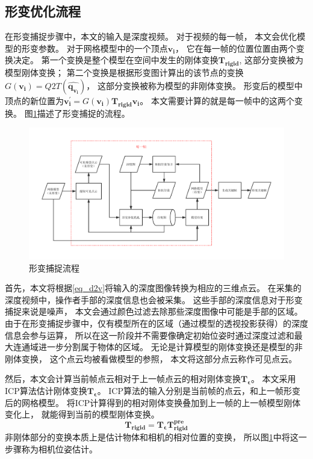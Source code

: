 \subsection{形变优化流程}
在形变捕捉步骤中，本文的输入是深度视频。
对于视频的每一帧，
本文会优化模型的形变参数。
对于网格模型中的一个顶点$\bm{v_i}$，
它在每一帧的位置位置由两个变换决定。
第一个变换是整个模型在空间中发生的刚体变换$\bm{T_{rigid}}$,
这部分变换被为模型刚体变换；
第二个变换是根据形变图计算出的该节点的变换$G(\bm{v_i})=Q2T(\hat{\bm{q_{v_i}}})$，
这部分变换被称为模型的非刚体变换。
形变后的模型中顶点的新位置为$\bm{v_i^{'}}=G(\bm{v_i})\bm{T_{rigid}}\bm{v_i}$。
本文需要计算的就是每一帧中的这两个变换。
图\ref{deformation_sampling}描述了形变捕捉的流程。
\begin{figure}
    \centering
    \includegraphics[width = \textwidth]{./Pictures/ds_pipeline_cropped.pdf}
    \caption{形变捕捉流程}
    \label{deformation_sampling}
\end{figure}
首先，本文将根据\ref{eq_d2v}将输入的深度图像转换为相应的三维点云。
在采集的深度视频中，操作者手部的深度信息也会被采集。
这些手部的深度信息对于形变捕捉来说是噪声，
本文会通过颜色过滤去除那些深度图像中可能是手部的区域。
由于在形变捕捉步骤中，仅有模型所在的区域（通过模型的透视投影获得）的深度信息会参与运算，
所以在这一阶段并不需要像确定初始位姿时通过深度过滤和最大连通域进一步分割属于物体的区域。
无论是计算模型的刚体变换还是模型的非刚体变换，
这个点云均被看做模型的参照，
本文将这部分点云称作可见点云。

然后，本文会计算当前帧点云相对于上一帧点云的相对刚体变换$\bm{T_{\epsilon }}$。
本文采用ICP算法估计刚体变换$\bm{T_{\epsilon }}$。
ICP算法的输入分别是当前帧的点云，和上一帧形变后的网格模型。 
将ICP计算得到的相对刚体变换叠加到上一帧的上一帧模型刚体变化上，
就能得到当前的模型刚体变换。
\begin{equation}
    \bm{T_{rigid}}=\bm{T_{\epsilon}}\bm{T_{rigid}^{pre}}
\end{equation}
非刚体部分的变换本质上是估计物体和相机的相对位置的变换，
所以图\ref{deformation_sampling}中将这一步骤称为相机位姿估计。

